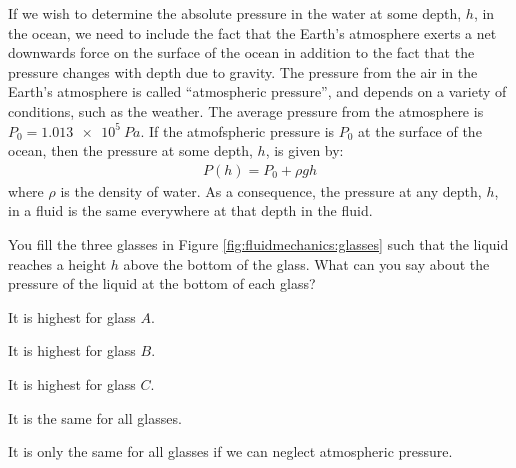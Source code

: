 If we wish to determine the absolute pressure in the water at some depth, $h$, in the ocean, we need to include the fact that the Earth's atmosphere exerts a net downwards force on the surface of the ocean in addition to the fact that the pressure changes with depth due to gravity. The pressure from the air in the Earth's atmosphere is called ``atmospheric pressure'', and depends on a variety of conditions, such as the weather. The average pressure from the atmosphere is $P_0=\SI{1.013e5}{Pa}$. If the atmofspheric pressure is $P_0$ at the surface of the ocean, then the pressure at some depth, $h$, is given by:
\begin{align*}
P(h) = P_0 + \rho g h
\end{align*}
where $\rho$ is the density of water. As a consequence, the pressure at any depth, $h$, in a fluid is the same everywhere at that depth in the fluid. 
\begin{checkpoint}
\begin{MCquestion}{You fill the three glasses in Figure \ref{fig:fluidmechanics:glasses} such that the liquid reaches a height $h$ above the bottom of the glass. What can you say about the pressure of the liquid at the bottom of each glass?}
\item It is highest for glass $A$.
\item It is highest for glass $B$.
\item It is highest for glass $C$.
\item It is the same for all glasses. \correct
\item It is only the same for all glasses if we can neglect atmospheric pressure. 
\end{MCquestion}
\end{checkpoint}
\newpage
